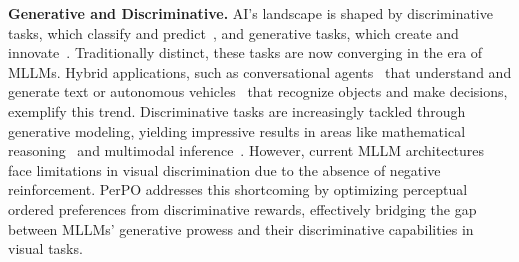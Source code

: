 \textbf{Generative and Discriminative.} AI's landscape is shaped by discriminative tasks, which classify and predict~\citep{distask1, distask2, detr}, and generative tasks, which create and innovate~\citep{radford2018improving, radford2019language}. Traditionally distinct, these tasks are now converging in the era of MLLMs. Hybrid applications, such as conversational agents~\citep{brown2020language, agent2, agent1} that understand and generate text or autonomous vehicles~\citep{auto1, auto3, auto2} that recognize objects and make decisions, exemplify this trend. Discriminative tasks are increasingly tackled through generative modeling, yielding impressive results in areas like mathematical reasoning~\citep{mathz1, mathz2} and multimodal inference~\citep{inferz1, inferz2}. However, current MLLM architectures face limitations in visual discrimination due to the absence of negative reinforcement. PerPO addresses this shortcoming by optimizing perceptual ordered preferences from discriminative rewards, effectively bridging the gap between MLLMs' generative prowess and their discriminative capabilities in visual tasks.


\vspace{-0.5em}